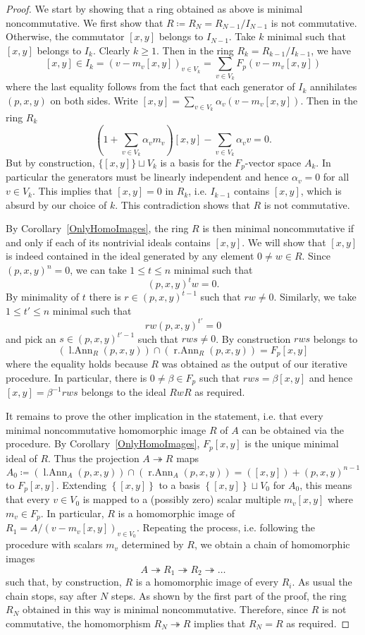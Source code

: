 \documentclass[11pt]{article}
\DeclareMathOperator{\lAnn}{l.Ann}
\DeclareMathOperator{\rAnn}{r.Ann}
\theoremstyle{definition}
\begin{document}
\begin{proof}
We start by showing that a ring obtained as above is minimal noncommutative. We first show that $R\coloneqq R_N=R_{N-1}/I_{N-1}$ is not commutative. Otherwise, the commutator $[x,y]$ belongs to $I_{N-1}$. Take $k$ minimal such that $[x,y]$ belongs to $I_k$. Clearly $k\geq 1$. Then in the ring $R_k=R_{k-1}/I_{k-1}$, we have
\[[x,y]\in I_k=(v-m_v[x,y])_{v\in V_k}=\sum_{v\in V_k}F_p(v-m_v[x,y])\]
where the last equality follows from the fact that each generator of $I_k$ annihilates $(p,x,y)$ on both sides. Write $[x,y]=\sum_{v\in V_k}\alpha_v(v-m_v[x,y])$. Then in the ring $R_k$
\[\left(1+\sum_{v\in V_k}\alpha_v m_v\right)[x,y]-\sum_{v\in V_k}\alpha_vv=0.\]
But by construction, $\lbrace[x,y]\rbrace\sqcup V_k$ is a basis for the $F_p$-vector space $A_k$. In particular the generators must be linearly independent and hence $\alpha_v=0$ for all $v\in V_k$. This implies that $[x,y]=0$ in $R_k$, i.e. $I_{k-1}$ contains $[x,y]$, which is absurd by our choice of $k$. This contradiction shows that $R$ is not commutative.

By Corollary~\ref{OnlyHomoImages}, the ring $R$ is then minimal noncommutative if and only if each of its nontrivial ideals contains $[x,y]$. We will show that $[x,y]$ is indeed contained in the ideal generated by any element $0\neq w\in R$. Since $(p,x,y)^n=0$, we can take $1\leq t\leq n$ minimal such that
\[(p,x,y)^tw=0.\]
By minimality of $t$ there is $r\in(p,x,y)^{t-1}$ such that $rw\neq 0$. Similarly, we take $1\leq t'\leq n$ minimal such that
\[rw(p,x,y)^{t'}=0\]
and pick an $s\in(p,x,y)^{t'-1}$ such that $rws\neq 0$. By construction $rws$ belongs to
\[\left(\lAnn_R(p,x,y)\right)\cap\left(\rAnn_R(p,x,y)\right)=F_p[x,y]\]
where the equality holds because $R$ was obtained as the output of our iterative procedure. In particular, there is $0\neq\beta\in F_p$ such that $rws=\beta[x,y]$ and hence $[x,y]=\beta^{-1}rws$ belongs to the ideal $RwR$ as required.

It remains to prove the other implication in the statement, i.e. that every minimal noncommutative homomorphic image $R$ of $A$ can be obtained via the procedure. By Corollary~\ref{OnlyHomoImages}, $F_p[x,y]$ is the unique minimal ideal of $R$. Thus the projection $A\twoheadrightarrow R$ maps
\[A_0\coloneqq \left(\lAnn_{A}(p,x,y)\right)\cap\left(\rAnn_{A}(p,x,y)\right)=([x,y])+(p,x,y)^{n-1}\]
to $F_p[x,y]$. Extending $\left\lbrace[x,y]\right\rbrace$ to a basis $\left\lbrace[x,y]\right\rbrace\sqcup V_0$ for $A_0$, this means that every $v\in V_0$ is mapped to a (possibly zero) scalar multiple $m_v[x,y]$ where $m_v\in F_p$. In particular, $R$ is a homomorphic image of $R_1=A/\left(v-m_v[x,y]\right)_{v\in V_0}$. Repeating the process, i.e. following the procedure with scalars $m_v$ determined by $R$, we obtain a chain of homomorphic images
\[A\twoheadrightarrow R_1\twoheadrightarrow R_2\twoheadrightarrow\ldots\]
such that, by construction, $R$ is a homomorphic image of every $R_i$. As usual the chain stops, say after $N$ steps. As shown by the first part of the proof, the ring $R_N$ obtained in this way is minimal noncommutative. Therefore, since $R$ is not commutative, the homomorphism $R_N\twoheadrightarrow R$ implies that $R_N=R$ as required.
\end{proof}
\end{document}
